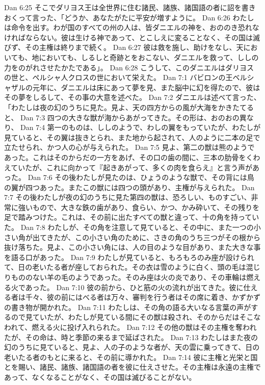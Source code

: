 Dan 6:25  そこでダリヨス王は全世界に住む諸民、諸族、諸国語の者に詔を書きおくって言った、「どうか、あなたがたに平安が増すように。
Dan 6:26  わたしは命令を出す。わが国のすべての州の人は、皆ダニエルの神を、おののき恐れなければならない。彼は生ける神であって、とこしえに変ることなく、その国は滅びず、その主権は終りまで続く。
Dan 6:27  彼は救を施し、助けをなし、天においても、地においても、しるしと奇跡とをおこない、ダニエルを救って、ししの力をのがれさせたかたである」。
Dan 6:28  こうして、このダニエルはダリヨスの世と、ペルシャ人クロスの世において栄えた。
Dan 7:1  バビロンの王ベルシャザルの元年に、ダニエルは床にあって夢を見、また脳中に幻を得たので、彼はその夢をしるして、その事の大意を述べた。
Dan 7:2  ダニエルは述べて言った、「わたしは夜の幻のうちに見た。見よ、天の四方からの風が大海をかきたてると、
Dan 7:3  四つの大きな獣が海からあがってきた。その形は、おのおの異なり、
Dan 7:4  第一のものは、ししのようで、わしの翼をもっていたが、わたしが見ていると、その翼は抜きとられ、また地から起されて、人のように二本の足で立たせられ、かつ人の心が与えられた。
Dan 7:5  見よ、第二の獣は熊のようであった。これはそのからだの一方をあげ、その口の歯の間に、三本の肋骨をくわえていたが、これに向かって『起きあがって、多くの肉を食らえ』と言う声があった。
Dan 7:6  その後わたしが見たのは、ひょうのような獣で、その背には鳥の翼が四つあった。またこの獣には四つの頭があり、主権が与えられた。
Dan 7:7  その後わたしが夜の幻のうちに見た第四の獣は、恐ろしい、ものすごい、非常に強いもので、大きな鉄の歯があり、食らい、かつ、かみ砕いて、その残りを足で踏みつけた。これは、その前に出たすべての獣と違って、十の角を持っていた。
Dan 7:8  わたしが、その角を注意して見ていると、その中に、また一つの小さい角が出てきたが、この小さい角のために、さきの角のうち三つがその根から抜け落ちた。見よ、この小さい角には、人の目のような目があり、また大きな事を語る口があった。
Dan 7:9  わたしが見ていると、もろもろのみ座が設けられて、日の老いたる者が座しておられた。その衣は雪のように白く、頭の毛は混じりもののない羊の毛のようであった。そのみ座は火の炎であり、その車輪は燃える火であった。
Dan 7:10  彼の前から、ひと筋の火の流れが出てきた。彼に仕える者は千々、彼の前にはべる者は万々、審判を行う者はその席に着き、かずかずの書き物が開かれた。
Dan 7:11  わたしは、その角の語る大いなる言葉の声がするので見ていたが、わたしが見ている間にその獣は殺され、そのからだはそこなわれて、燃える火に投げ入れられた。
Dan 7:12  その他の獣はその主権を奪われたが、その命は、時と季節の来るまで延ばされた。
Dan 7:13  わたしはまた夜の幻のうちに見ていると、見よ、人の子のような者が、天の雲に乗ってきて、日の老いたる者のもとに来ると、その前に導かれた。
Dan 7:14  彼に主権と光栄と国とを賜い、諸民、諸族、諸国語の者を彼に仕えさせた。その主権は永遠の主権であって、なくなることがなく、その国は滅びることがない。
